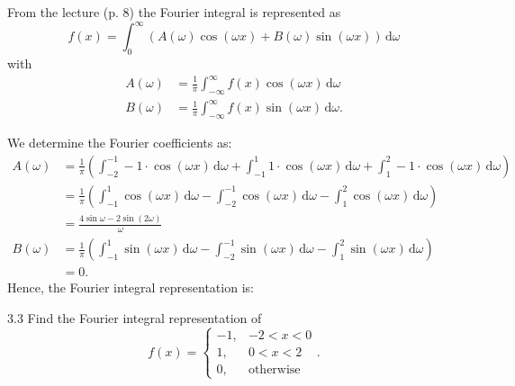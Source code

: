 \begin{derivation}
  From the lecture (p. 8) the Fourier integral is represented as
  \begin{equation*}
    f(x) = \int_{0}^{\infty} \left( A(\omega) \cos(\omega x) + B(\omega) \sin(\omega x) \right) \, \mathrm{d}\omega
  \end{equation*}
  with
  \begin{align*}
    A(\omega) &= \frac{1}{\pi} \int_{-\infty}^{\infty} f(x) \cos(\omega x) \, \mathrm{d}\omega \\
    B(\omega) &= \frac{1}{\pi} \int_{-\infty}^{\infty} f(x) \sin(\omega x) \, \mathrm{d}\omega
  .\end{align*}

  We determine the Fourier coefficients as:
  \begin{align*}
    A(\omega) &= \frac{1}{\pi} \left( \int_{-2}^{-1} - 1 \cdot \cos (\omega x) \, \mathrm{d}\omega + \int_{-1}^{1} 1 \cdot \cos(\omega x) \, \mathrm{d}\omega + \int_{1}^{2} -1 \cdot \cos(\omega x) \, \mathrm{d}\omega  \right)   \\
      &= \frac{1}{\pi} \left( \int_{-1}^{1} \cos (\omega x) \, \mathrm{d}\omega - \int_{-2}^{-1} \cos (\omega x) \, \mathrm{d}\omega - \int_{1}^{2} \cos (\omega x) \, \mathrm{d}\omega \right) \\
      &= \frac{4 \sin \omega - 2 \sin (2\omega)}{\omega} \\
    B(\omega) &= \frac{1}{\pi} \left( \int_{-1}^{1} \sin (\omega x) \, \mathrm{d}\omega - \int_{-2}^{-1} \sin (\omega x) \, \mathrm{d}\omega - \int_{1}^{2} \sin (\omega x) \, \mathrm{d}\omega \right) \\
              &= 0
  .\end{align*}
  Hence, the Fourier integral representation is:
\end{derivation}


\begin{problem}{3.3}
Find the Fourier integral representation of
\[ 
f(x) = \begin{cases}
-1, & -2 < x < 0\\
1,  & 0 < x < 2 \\
0, & \text{otherwise}
\end{cases}
.\]
\end{problem}

